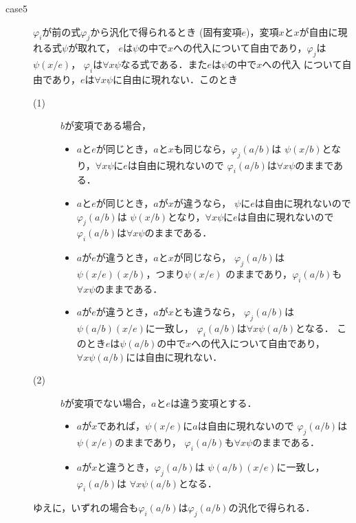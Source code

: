 \begin{metaprf}
\begin{description}
			\item[case5] $\varphi_{i}$が前の式$\varphi_{j}$から汎化で得られるとき
				(固有変項$e$)，変項$x$と$x$が自由に現れる式$\psi$が取れて，
				$e$は$\psi$の中で$x$への代入について自由であり，$\varphi_{j}$は$\psi(x/e)$，
				$\varphi_{i}$は$\forall x \psi$なる式である．また$e$は$\psi$の中で$x$への代入
				について自由であり，$e$は$\forall x \psi$に自由に現れない．このとき
				
				\begin{description}
					\item[(1)] $b$が変項である場合，
						\begin{itemize}
							\item $a$と$e$が同じとき，$a$と$x$も同じなら，$\varphi_{j}(a/b)$は
								$\psi(x/b)$となり，$\forall x \psi$に$e$は自由に現れないので
								$\varphi_{i}(a/b)$は$\forall x \psi$のままである．
								
							\item $a$と$e$が同じとき，$a$が$x$が違うなら，
								$\psi$に$e$は自由に現れないので$\varphi_{j}(a/b)$は
								$\psi(x/b)$となり，$\forall x \psi$に$e$は自由に現れないので
								$\varphi_{i}(a/b)$は$\forall x \psi$のままである．
							
							\item $a$が$e$が違うとき，$a$と$x$が同じなら，
								$\varphi_{j}(a/b)$は$\psi(x/e)(x/b)$，つまり$\psi(x/e)$
								のままであり，$\varphi_{i}(a/b)$も$\forall x \psi$のままである．
							
							\item $a$が$e$が違うとき，$a$が$x$とも違うなら，
								$\varphi_{j}(a/b)$は$\psi(a/b)(x/e)$に一致し，
								$\varphi_{i}(a/b)$は$\forall x \psi(a/b)$となる．
								このとき$e$は$\psi(a/b)$の中で$x$への代入について自由であり，
								$\forall x \psi(a/b)$には自由に現れない．
						\end{itemize}
						
					\item[(2)] $b$が変項でない場合，$a$と$e$は違う変項とする．
						\begin{itemize}
							\item $a$が$x$であれば，$\psi(x/e)$に$a$は自由に現れないので
								$\varphi_{j}(a/b)$は$\psi(x/e)$のままであり，
								$\varphi_{i}(a/b)$も$\forall x \psi$のままである．
							
							\item $a$が$x$と違うとき，$\varphi_{j}(a/b)$は
								$\psi(a/b)(x/e)$に一致し，$\varphi_{i}(a/b)$は
								$\forall x \psi(a/b)$となる．
						\end{itemize}
				\end{description}
				ゆえに，いずれの場合も$\varphi_{i}(a/b)$は$\varphi_{j}(a/b)$の汎化で得られる．
				\QED
		\end{description}
	\end{metaprf}
	
